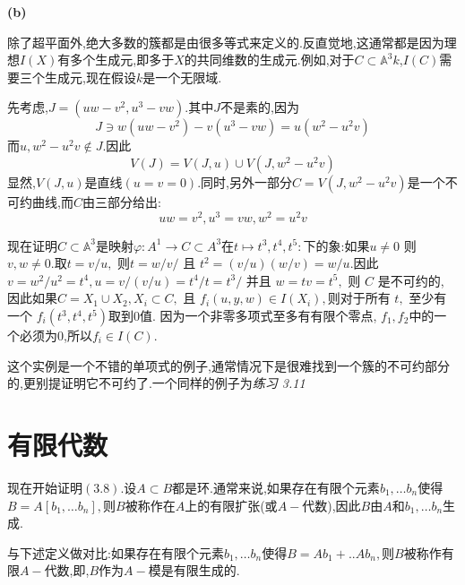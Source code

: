 \documentclass[UTF8]{book}
\begin{document}
		
		\textbf{(b)}
		
		
		除了超平面外,绝大多数的簇都是由很多等式来定义的.反直觉地,这通常都是因为理想$ I(X) $有多个生成元,即多于$ X $的共同维数的生成元.例如,对于$C \subset \mathbb{A} ^{3} k$,$ I(C) $需要三个生成元,现在假设$ k $是一个无限域.
		
		
		先考虑,$J =\left(uw - v ^{2}, u ^{3}- vw \right)$.其中$ J$不是素的,因为
		\begin{equation*}
		 J \ni w \left(uw - v ^{2}\right)- v \left(u ^{3}- v w \right)= u \left(w ^{2}- u ^{2} v \right)
		\end{equation*}
		 而$ u , w ^{2}- u ^{2} v \notin J $.因此
		 \begin{equation*}
		 	V (J )= V (J , u ) \cup V \left(J , w ^{2}- u ^{2} v \right)
		 \end{equation*}
		 显然,$ V (J , u ) $是直线$ (u = v =0) $.同时,另外一部分$  C = V \left(J , w ^{2}- u ^{2} v \right)$是一个不可约曲线,而$ C $由三部分给出:
		 \begin{equation*}
		 	uw = v ^{2}, u ^{3}= vw , w ^{2}= u ^{2} v
		 \end{equation*}
		
		
		现在证明$C \subset \mathbb{A} ^{3}$是映射$\varphi: A ^{1} \rightarrow C \subset A ^{3}$在$t \mapsto t^{3}, t^{4}, t^{5}:$下的象:如果$u \neq 0$ 则 $v, w \neq 0 .$取$t=v / u,$ 则$t=w / v /$ 且 $t ^{2}=(v / u )(w / v )= w / u .$因此$v = w ^{2} / u ^{2}= t ^{4}, u = v /(v / u )= t ^{4} / t = t ^{3} /$ 并且
		$w = tv = t ^{5},$ 则 $C$ 是不可约的, 因此如果$C = X _{1} \cup X _{2}, X _{ i } \subset C ,$ 且 $f _{ i }(u , y , w ) \in I \left(X _{ i }\right),$则对于所有 $t ,$ 至少有一个 $f _{ i }\left(t ^{3}, t ^{4}, t ^{5}\right)$取到0值. 因为一个非零多项式至多有有限个零点, $f_{1}, f_{2}$中的一个必须为0,所以$f _{ i } \in I (C )$.
		
		
		这个实例是一个不错的单项式的例子,通常情况下是很难找到一个簇的不可约部分的,更别提证明它不可约了.一个同样的例子为\textit{练习 3.11}
		
		
	\section{有限代数}
		现在开始证明$ (3.8) $.设$A \subset B$都是环.通常来说,如果存在有限个元素$b_{1}, \dots b_{n}$使得$B=A\left[b_{1}, \ldots b_{n}\right],$则$ B $被称作在$ A $上的有限扩张(或$ A- $代数),因此$ B$由$ A $和$b_{1}, \ldots b_{n}$生成.
		
		
		与下述定义做对比:如果存在有限个元素$b_{1}, \dots b_{n}$使得$B=A b_{1}+. . A b_{n},$则$ B $被称作有限$ A- $代数,即,$ B $作为$ A- $模是有限生成的.
		
\end{document}
